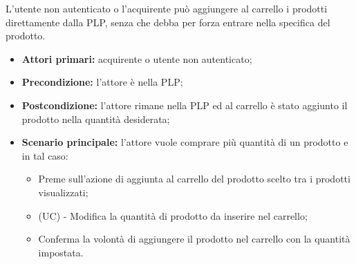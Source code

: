 L'utente non autenticato o l'acquirente può aggiungere al carrello i prodotti direttamente dalla PLP, senza che debba per forza entrare nella  specifica del prodotto.
\begin{itemize}
    \item \textbf{Attori primari:} acquirente o utente non autenticato;
    \item \textbf{Precondizione:} l'attore è nella PLP;
    \item \textbf{Postcondizione:} l'attore rimane nella PLP ed al carrello è stato aggiunto il prodotto nella quantità desiderata;
    \item \textbf{Scenario principale:} l'attore vuole comprare più quantità di un prodotto e in tal caso:
    \begin{itemize}
        \item Preme sull'azione di aggiunta al carrello del prodotto scelto tra i prodotti visualizzati;
        \item (UC) - Modifica la quantità di prodotto da inserire nel carrello;
        \item Conferma la volontà di aggiungere il prodotto nel carrello con la quantità impostata.
    \end{itemize}
\end{itemize}